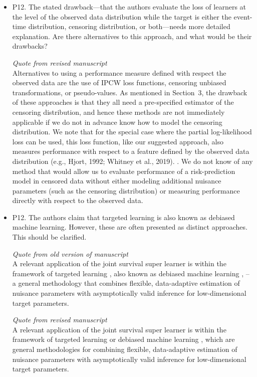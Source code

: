 \documentclass[a4paper,danish]{article}
\newcommand{\1}{\mathds{1}}
\newcommand{\qrev}[1]{
\vspace{.5em}
\begin{tcolorbox}[boxrule=0pt]
\hfill{\it\footnotesize Quote from revised manuscript}\\[.5em]
#1
\end{tcolorbox}
}
\newcommand{\qold}[1]{
\vspace{.5em}
\begin{tcolorbox}[boxrule=0pt,colback=pink]
\hfill{\it\footnotesize Quote from old version of manuscript}\\[.5em]
#1
\end{tcolorbox}
}
\newcommand{\answer}[1]{{\vspace{1em}{\bf #1}\vspace{1em}}}
\begin{document}
\begin{itemize}
\item P12. The stated drawback—that the authors evaluate the loss of
learners at the level of the observed data distribution while the
target is either the event-time distribution, censoring
distribution, or both—needs more detailed explanation. Are there
alternatives to this approach, and what would be their drawbacks?

  \answer{We have addressed this partly in our answer to Reviewer 1's
    first comment, please see above. We briefly mention alternative
    approaches in Section 3, and we now reiterate and expand on these
    points in the Discussion, please see the paragraph below which we
    have added to the Discussion.}

  \qrev{
  Alternatives to using a performance measure defined with respect the
  observed data are the use of IPCW loss functions, censoring unbiased
  transformations, or pseudo-values. As mentioned in
  Section~3, the drawback of these approaches is
  that they all need a pre-specified estimator of the censoring
  distribution, and hence these methods are not immediately applicable
  if we do not in advance know how to model the censoring
  distribution. We note that for the special case where the partial
  log-likelihood loss can be used, this loss function, like our
  suggested approach, also measures performance with respect to a
  feature defined by the observed data distribution (e.g., Hjort, 1992;
Whitney et al., 2019).
  \citep[e.g.,][]{hjort1992inference,whitney2019comment}. We do not know
  of any method that would allow us to evaluate performance of a
  risk-prediction model in censored data without either modeling
  additional nuisance parameters (such as the censoring distribution) or
  measuring performance directly with respect to the observed data.
  }
\end{itemize}


\begin{itemize}
\item P12. The authors claim that targeted learning is also known as
debiased machine learning.  However, these are often presented as
distinct approaches. This should be clarified.

\answer{This is a fair point. We have updated the text accordingly:}

\qold{
A relevant application of the joint survival super learner is within
the framework of targeted learning \citep{van2011targeted}, also known
as debiased machine learning \citep{chernozhukov2018double}, -- a
general methodology that combines flexible, data-adaptive estimation
of nuisance parameters with asymptotically valid inference for
low-dimensional target parameters.
}

\qrev{ A relevant application of the joint survival super learner is
  within the framework of targeted learning \citep{van2011targeted} or
  debiased machine learning \citep{chernozhukov2018double}, which are
  general methodologies for combining flexible, data-adaptive
  estimation of nuisance parameters with asymptotically valid
  inference for low-dimensional target parameters.  }
\end{itemize}
\end{document}
